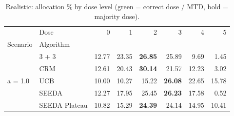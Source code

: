 \begin{table}[H]
\centering
\caption{Realistic: allocation \% by dose level (green = correct dose / MTD, bold = majority dose).}
\label{tab:real_alloc_by_dose}
\begin{tabular}{llrrrrrr}
\toprule
 & Dose & 0 & 1 & 2 & 3 & 4 & 5 \\
Scenario & Algorithm &  &  &  &  &  &  \\
\midrule
\multirow[c]{5}{*}{a = 1.0} & 3 + 3 & 12.77 & 23.35 & {\cellcolor[HTML]{C8E6C9}} \bfseries 26.85 & 25.89 & 9.69 & 1.45 \\
 & CRM & 12.61 & 20.43 & {\cellcolor[HTML]{C8E6C9}} \bfseries 30.14 & 21.57 & 12.23 & 3.02 \\
 & UCB & 10.00 & 10.27 & {\cellcolor[HTML]{C8E6C9}} 15.22 & \bfseries 26.08 & 22.65 & 15.78 \\
 & SEEDA & 12.27 & 17.95 & {\cellcolor[HTML]{C8E6C9}} 25.45 & \bfseries 26.23 & 17.58 & 0.52 \\
 & SEEDA Plateau & 10.82 & 15.29 & {\cellcolor[HTML]{C8E6C9}} \bfseries 24.39 & 24.14 & 14.95 & 10.41 \\
\bottomrule
\end{tabular}
\end{table}
